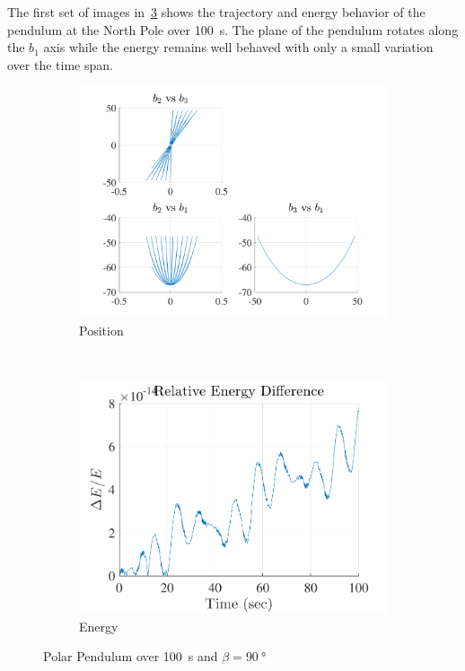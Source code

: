 \documentclass[11pt, reqno]{article}   	%
\begin{document}
The first set of images in~\cref{fig:pole_pendulum_short} shows the trajectory and energy behavior of the pendulum at the North Pole over \SI{100}{s}.
The plane of the pendulum rotates along the \( b_1 \) axis while the energy remains well behaved with only a small variation over the time span.
\begin{figure}[htbp] 
    \centering 
    \begin{subfigure}[htbp]{0.5\textwidth} 
        \includegraphics[width=\textwidth]{figures/pole_position_short.pdf} 
        \caption{Position } \label{fig:pole_pos_short} 
    \end{subfigure}~ %
    \begin{subfigure}[htbp]{0.5\textwidth} 
        \includegraphics[width=\textwidth]{figures/pole_energy_short.pdf} 
        \caption{Energy } \label{fig:pole_energy_short} 
    \end{subfigure}
    \caption{Polar Pendulum over \SI{100}{s} and \( \beta = \SI{90}{\degree} \)}
    \label{fig:pole_pendulum_short} 
\end{figure}
\end{document}
